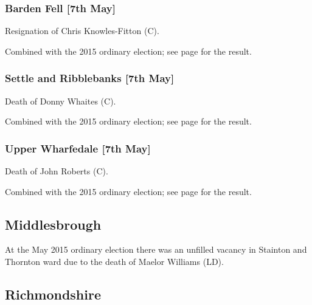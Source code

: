 \documentclass[a4paper,openany]{book}
\begin{document}
\begin{resultsiii}
\subsubsection*{Barden Fell \hspace*{\fill}\nolinebreak[1]%
\enspace\hspace*{\fill}
[7th May]}


Resignation of Chris Knowles-Fitton (C).

Combined with the 2015 ordinary election; see page \pageref{BardenFellCraven} for the result.

\subsubsection*{Settle and Ribblebanks \hspace*{\fill}\nolinebreak[1]%
\enspace\hspace*{\fill}
[7th May]}


Death of Donny Whaites (C).

Combined with the 2015 ordinary election; see page \pageref{SettleRibblebanksCraven} for the result.

\subsubsection*{Upper Wharfedale \hspace*{\fill}\nolinebreak[1]%
\enspace\hspace*{\fill}
[7th May]}


Death of John Roberts (C).

Combined with the 2015 ordinary election; see page \pageref{UpperWharfedaleCraven} for the result.

\subsection*{Middlesbrough}

At the May 2015 ordinary election there was an unfilled vacancy in Stainton and Thornton ward due to the death of Maelor Williams (LD).

\subsection*{Richmondshire}


\end{resultsiii}
\end{document}
